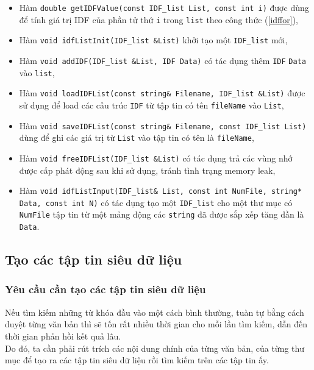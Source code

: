 \documentclass[12pt,a4paper]{article}
\begin{document}
\begin{itemize}
\item Hàm \lstinline{double getIDFValue(const IDF_list List, const int i)} được dùng để tính giá trị IDF của phần tử thứ \lstinline{i} trong \lstinline{list} theo công thức (\ref{idffor}),
\item Hàm \lstinline{void idfListInit(IDF_list &List)} khởi tạo một \lstinline{IDF_list} mới,
\item Hàm \lstinline{void addIDF(IDF_list &List, IDF Data)} có tác dụng thêm \lstinline{IDF} \lstinline{Data} vào \lstinline{list},
\item Hàm \lstinline{void loadIDFList(const string& Filename, IDF_list &List)} được sử dụng để load các cấu trúc \lstinline{IDF} từ tập tin có tên \lstinline{fileName} vào \lstinline{List},
\item Hàm \lstinline{void saveIDFList(const string& Filename, const IDF_list List)} dùng để ghi các giá trị từ \lstinline{List} vào tập tin có tên là \lstinline{fileName},
\item Hàm \lstinline{void freeIDFList(IDF_list &List)} có tác dụng trả các vùng nhớ được cấp phát động sau khi sử dụng, tránh tình trạng memory leak,
\item Hàm \lstinline{void idfListInput(IDF_list& List, const int NumFile, string* Data, const int N)} có tác dụng tạo một \lstinline{IDF_list} cho một thư mục có \lstinline{NumFile} tập tin từ một mảng động các \lstinline{string} đã được sắp xếp tăng dần là \lstinline{Data}.
\end{itemize}
\subsection{Tạo các tập tin siêu dữ liệu}
\subsubsection{Yêu cầu cần tạo các tập tin siêu dữ liệu}
Nếu tìm kiếm những từ khóa đầu vào một cách bình thường, tuàn tự bằng cách duyệt từng văn bản thì sẽ tốn rất nhiều thời gian cho mỗi lần tìm kiếm, dẫn đến thời gian phản hồi kết quả lâu.\\
Do đó, ta cần phải rút trích các nội dung chính của từng văn bản, của từng thư mục để tạo ra các tập tin siêu dữ liệu rồi tìm kiếm trên các tập tin ấy.
\end{document}
